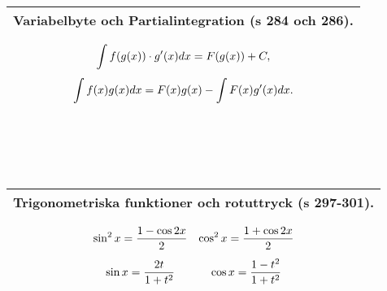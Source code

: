 \documentclass[a4paper]{article}
\begin{document}
\\\\\\
\begin{tabular}{|L{11.5cm}|} \hline
\textbf{Variabelbyte och Partialintegration} (s 284 och 286).
\begin{equation*}
\begin{array}{>{\displaystyle}c}
\int f(g(x))\cdot g'(x)dx = F(g(x)) + C,\\
\int f(x)g(x)dx = F(x)g(x)-\int F(x)g'(x)dx.
\end{array}
\end{equation*}
\\\hline
\end{tabular}
\\\\\\
\begin{tabular}{|L{11.5cm}|} \hline
\textbf{Trigonometriska funktioner och rotuttryck} (s 297-301).
\begin{equation*}
\renewcommand{\arraystretch}{2.5}
\begin{array}{>{\displaystyle}c>{\displaystyle}c}
\sin ^2x = \frac{1-\cos 2x}{2} &
\cos ^2x = \frac{1+\cos 2x}{2} \\
\sin x = \frac{2t}{1+t^2} &
\cos x = \frac{1-t^2}{1+t^2} \\
\end{array}
\end{equation*}
\\\hline
\end{tabular}
\end{document}
